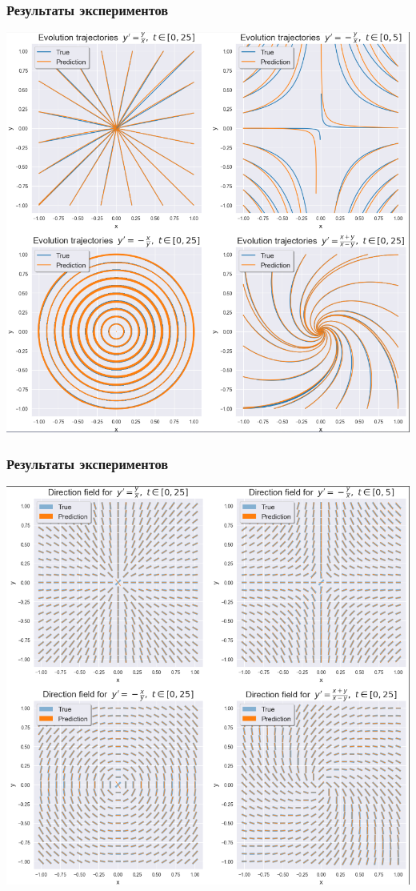 \documentclass[8pt]{beamer}
\begin{document}
\begin{frame}
	\frametitle{Результаты экспериментов}
	\begin{center}
		\includegraphics[scale = 0.37]{trajectories.png}
	\end{center}
\end{frame}

\begin{frame}
	\frametitle{Результаты экспериментов}
	\begin{center}		
		\includegraphics[scale = 0.37]{direction field.png}
	\end{center}
\end{frame}
\end{document}
